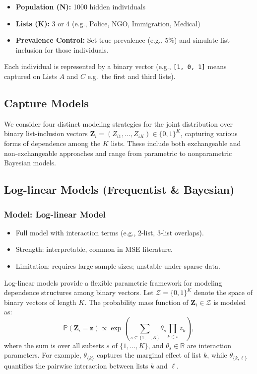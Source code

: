 \documentclass[
  12pt,
]{article}
\providecommand{\tightlist}{%
  \setlength{\itemsep}{0pt}\setlength{\parskip}{0pt}}\usepackage{longtable,booktabs,array}
\theoremstyle{plain}
\theoremstyle{definition}
\begin{document}
\begin{itemize}
\tightlist
\item
  \textbf{Population (N):} 1000 hidden individuals
\item
  \textbf{Lists (K):} 3 or 4 (e.g., Police, NGO, Immigration, Medical)
\item
  \textbf{Prevalence Control:} Set true prevalence (e.g., 5\%) and
  simulate list inclusion for those individuals.
\end{itemize}

Each individual is represented by a binary vector (e.g.,
\texttt{{[}1,\ 0,\ 1{]}} means captured on Lists \(A\) and \(C\)
e.g.~the first and third lists).

\subsection{Capture Models}\label{capture-models}

We consider four distinct modeling strategies for the joint distribution
over binary list-inclusion vectors
\(\mathbf{Z}_i = (Z_{i1}, \ldots, Z_{iK}) \in \{0,1\}^K\), capturing
various forms of dependence among the \(K\) lists. These include both
exchangeable and non-exchangeable approaches and range from parametric
to nonparametric Bayesian models.

\subsection{Log-linear Models (Frequentist \&
Bayesian)}\label{log-linear-models-frequentist-bayesian}

\subsubsection{Model: Log-linear Model}\label{model-log-linear-model}

\begin{itemize}
\tightlist
\item
  Full model with interaction terms (e.g., 2-list, 3-list overlaps).
\item
  Strength: interpretable, common in MSE literature.
\item
  Limitation: requires large sample sizes; unstable under sparse data.
\end{itemize}

Log-linear models provide a flexible parametric framework for modeling
dependence structures among binary vectors. Let
\(\mathcal{Z} = \{0,1\}^K\) denote the space of binary vectors of length
\(K\). The probability mass function of \(\mathbf{Z}_i \in \mathcal{Z}\)
is modeled as: \[
\mathbb{P}(\mathbf{Z}_i = \mathbf{z}) \propto \exp\left( \sum_{s \subseteq \{1, \ldots, K\}} \theta_s \prod_{k \in s} z_k \right),
\] where the sum is over all subsets \(s\) of \(\{1, \ldots, K\}\), and
\(\theta_s \in \mathbb{R}\) are interaction parameters. For example,
\(\theta_{\{k\}}\) captures the marginal effect of list \(k\), while
\(\theta_{\{k,\ell\}}\) quantifies the pairwise interaction between
lists \(k\) and \(\ell\).
\end{document}
